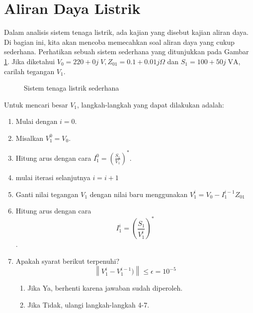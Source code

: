 \documentclass[12pt,a4paper]{memoir}
\begin{document}
\section{Aliran Daya Listrik}
Dalam analisis sistem tenaga listrik, ada kajian yang disebut kajian aliran daya. Di bagian ini, kita akan mencoba memecahkan soal aliran daya yang cukup sederhana. Perhatikan sebuah sistem sederhana yang ditunjukkan pada Gambar \ref{fig:stlsederhana}. Jika diketahui $V_0=220 + 0j  \;V, Z_{01}= 0.1 + 0.01j \Omega$ dan $S_1 = 100 + 50j \; \text{VA}$, carilah tegangan $V_1$.
\begin{figure}[h]
	\centering
{}
\caption{Sistem tenaga listrik sederhana}
\label{fig:stlsederhana}
\end{figure}

Untuk mencari besar $V_1$, langkah-langkah yang dapat dilakukan adalah:
\begin{enumerate}
	\item Mulai dengan $i=0$.
	\item Misalkan $V_1^0 = V_0$.
	\item Hitung arus dengan cara $I_1^0 =\left(\frac{S_1}{V_1}\right)^*$.
	\item mulai iterasi selanjutnya $i=i+1$
	\item Ganti nilai tegangan $V_1$  dengan nilai baru menggunakan $V_1^i =V_0 - I_1^{i-1}Z_{01}$
	\item Hitung arus dengan cara \[I_1^i =\left(\frac{S_1}{V_1^i}\right)^*\].
	\item Apakah syarat berikut terpenuhi?
	\[\left\lVert V_1^i - V_1^{i-1}) \right\rVert \leq \epsilon = 10^{-5}
	\]
	\begin{enumerate}
		\item Jika Ya, berhenti karena jawaban sudah diperoleh.
		\item Jika Tidak, ulangi langkah-langkah 4-7.  
	\end{enumerate}	 
\end{enumerate}
\end{document}
